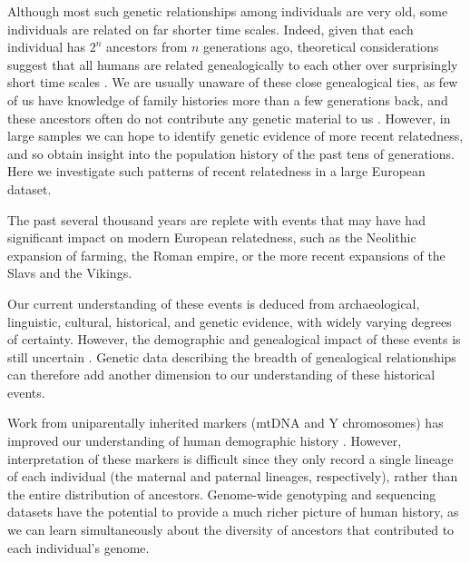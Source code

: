 \documentclass{article}
\begin{document}
Although most such genetic relationships among individuals are very old, some individuals are related on far shorter time scales.
Indeed, given that each individual has $2^n$ ancestors from $n$ generations ago,
theoretical considerations suggest that all humans are related genealogically to each other
over surprisingly short time scales \citep{chang1999,rohde2004modelling}.
We are usually unaware of these close genealogical ties, 
as few of us have knowledge of family histories more than a few
generations back, 
and these ancestors often do not contribute any genetic material to us \citep{donnelly1983probability}.
However, in large samples we can hope to identify genetic evidence of more recent relatedness,
and so obtain insight into the population history of the past tens of generations. 
Here we investigate such patterns of recent relatedness in a large European dataset.


The past several thousand years are replete with events that may have had significant impact on modern European relatedness,
such as the Neolithic expansion of farming,
the Roman empire, or the more recent expansions of the Slavs and the Vikings.

Our current understanding of these events is deduced from archaeological, linguistic, cultural, historical, and genetic evidence,
with widely varying degrees of certainty.
However, the demographic and genealogical impact of these events is still uncertain \citep[e.g.][]{gillett2006ethnogenesis}.
Genetic data describing the breadth of genealogical relationships
can therefore add another dimension to our understanding of these historical events.

Work from uniparentally inherited markers (mtDNA and Y chromosomes)
has improved our understanding of human demographic history \citep[e.g.][]{soares2010archaeogenetics}.
However, interpretation of these markers is difficult
since they only record a single lineage of each individual
(the maternal and paternal lineages, respectively),
rather than the entire distribution of ancestors.
Genome-wide genotyping and sequencing datasets have the potential to
provide a much richer picture of human history, 
as we can learn simultaneously about the diversity of ancestors 
that contributed to each individual's genome.
\end{document}
